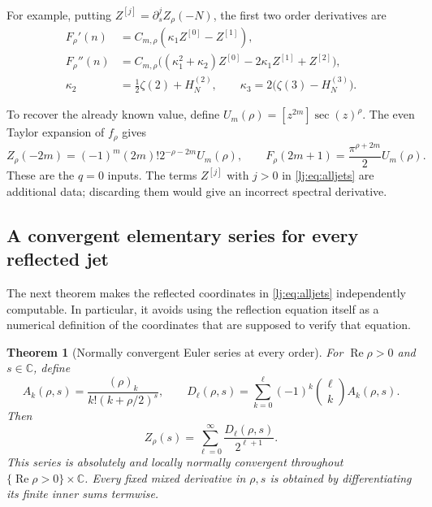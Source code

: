 \documentclass[11pt,a4paper]{article}
\numberwithin{equation}{section}
\newtheorem{theorem}{Theorem}[section]
\theoremstyle{definition}
\theoremstyle{remark}
\DeclareMathOperator{\re}{Re}
\begin{document}
For example, putting $Z^{[j]}=\partial_s^jZ_\rho(-N)$, the first two
order derivatives are
\begin{align}
 F_\rho'(n)&=C_{m,\rho}(\kappa_1Z^{[0]}-Z^{[1]}),
 \label{lj:eq:first}\\
 F_\rho''(n)&=C_{m,\rho}
       \bigl((\kappa_1^2+\kappa_2)Z^{[0]}
                      -2\kappa_1Z^{[1]}+Z^{[2]}\bigr),
 \label{lj:eq:second}\\
 \kappa_2&=\tfrac12\zeta(2)+H_N^{(2)},\qquad
 \kappa_3=2\bigl(\zeta(3)-H_N^{(3)}\bigr).\nonumber
\end{align}

To recover the already known value, define
$U_m(\rho)=[z^{2m}]\sec(z)^\rho$. The even Taylor expansion of
$f_\rho$ gives
\begin{equation}
 Z_\rho(-2m)=(-1)^m(2m)!2^{-\rho-2m}U_m(\rho),
 \qquad
 F_\rho(2m+1)=\frac{\pi^{\rho+2m}}2U_m(\rho).
 \label{lj:eq:valuecheck}
\end{equation}
These are the $q=0$ inputs. The terms $Z^{[j]}$ with $j>0$ in
\eqref{lj:eq:alljets} are additional data; discarding them would give
an incorrect spectral derivative.

\subsection{A convergent elementary series for every reflected jet}

The next theorem makes the reflected coordinates in
\eqref{lj:eq:alljets} independently computable. In particular, it avoids
using the reflection equation itself as a numerical definition of the
coordinates that are supposed to verify that equation.

\begin{theorem}[Normally convergent Euler series at every order]
\label{lj:thm:Euler}
For $\re\rho>0$ and $s\in\mathbb C$, define
\begin{equation}
 A_k(\rho,s)=\frac{(\rho)_k}{k!(k+\rho/2)^s},\qquad
 D_\ell(\rho,s)=\sum_{k=0}^\ell(-1)^k\binom\ell k A_k(\rho,s).
 \label{lj:eq:D}
\end{equation}
Then
\begin{equation}
 \boxed{\displaystyle
 Z_\rho(s)=\sum_{\ell=0}^\infty\frac{D_\ell(\rho,s)}{2^{\ell+1}}.}
 \label{lj:eq:Euler}
\end{equation}
This series is absolutely and locally normally convergent throughout
$\{\re\rho>0\}\times\mathbb C$. Every fixed mixed derivative in
$\rho,s$ is obtained by differentiating its finite inner sums termwise.
\end{theorem}
\end{document}
